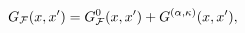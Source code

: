 \begin{equation}
G_{{\cal F}}(x,x')=G_{{\cal F}}^{0}(x,x')+G^{(\alpha,\kappa)}(x,x'),
\label{feynman}
\end{equation}

